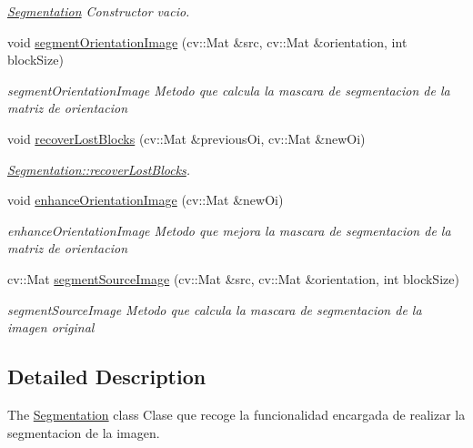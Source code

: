 \begin{DoxyCompactItemize}
\begin{DoxyCompactList}\small\item\em \hyperlink{class_segmentation}{Segmentation} Constructor vacio. \end{DoxyCompactList}\item 
void \hyperlink{class_segmentation_ab0d2ebe111a662ed67c07de29102481f}{segment\+Orientation\+Image} (cv\+::\+Mat \&src, cv\+::\+Mat \&orientation, int block\+Size)
\begin{DoxyCompactList}\small\item\em segment\+Orientation\+Image Metodo que calcula la mascara de segmentacion de la matriz de orientacion \end{DoxyCompactList}\item 
void \hyperlink{class_segmentation_a86fcdf95b93b524d785fbc7fd12321bf}{recover\+Lost\+Blocks} (cv\+::\+Mat \&previous\+Oi, cv\+::\+Mat \&new\+Oi)
\begin{DoxyCompactList}\small\item\em \hyperlink{class_segmentation_a86fcdf95b93b524d785fbc7fd12321bf}{Segmentation\+::recover\+Lost\+Blocks}. \end{DoxyCompactList}\item 
void \hyperlink{class_segmentation_a0f6a8043631caf1e59a4d4ee5f5e5cb4}{enhance\+Orientation\+Image} (cv\+::\+Mat \&new\+Oi)
\begin{DoxyCompactList}\small\item\em enhance\+Orientation\+Image Metodo que mejora la mascara de segmentacion de la matriz de orientacion \end{DoxyCompactList}\item 
cv\+::\+Mat \hyperlink{class_segmentation_a1369175d9507b677d9aa7e118ef13305}{segment\+Source\+Image} (cv\+::\+Mat \&src, cv\+::\+Mat \&orientation, int block\+Size)
\begin{DoxyCompactList}\small\item\em segment\+Source\+Image Metodo que calcula la mascara de segmentacion de la imagen original \end{DoxyCompactList}\end{DoxyCompactItemize}


\subsection{Detailed Description}
The \hyperlink{class_segmentation}{Segmentation} class Clase que recoge la funcionalidad encargada de realizar la segmentacion de la imagen. 


